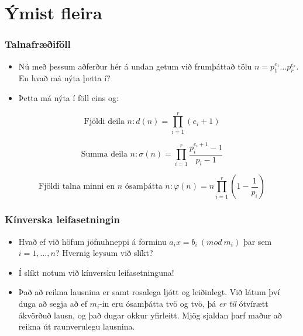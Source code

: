 \documentclass{beamer}
\newcommand\p[1]{\left(#1\right)}
\begin{document}
\section[Ýmist fleira]{Ýmist fleira}

\begin{frame}
\frametitle{Talnafræðiföll}

\begin{itemize}

\item<1-> Nú með þessum aðferður hér á undan getum við frumþáttað tölu $n = p_1^{e_1}\dots p_r^{e_r}$. En hvað má nýta þetta í?

\item<2-> Þetta má nýta í föll eins og:

\end{itemize}

 {\[\textrm{Fjöldi deila } n: d(n) = \prod_{i = 1}^r (e_i + 1)\]}

 {\[\textrm{Summa deila } n: \sigma(n) = \prod_{i = 1}^r \frac{p_i^{e_i + 1} - 1}{p_i - 1}\]}

 {\[\textrm{Fjöldi talna minni en } n \textrm{ ósamþátta } n: \varphi(n) = n\prod_{i = 1}^r \p{1 - \frac{1}{p_i}}\]}

\end{frame}

\begin{frame}
\frametitle{Kínverska leifasetningin}

\begin{itemize}

\item<1-> Hvað ef við höfum jöfnuhneppi á forminu $a_ix = b_i \ (mod \ m_i)$ þar sem $i = 1,\dots,n$? Hvernig leysum við slíkt?

\item<2-> Í slíkt notum við kínversku leifasetninguna!

\item<3-> Það að reikna lausnina er samt rosalega ljótt og leiðinlegt. Við látum því duga að segja að ef $m_i$-in eru ósamþátta tvö og tvö, þá \textit{er til} ótvírætt ákvörðuð lausn, og það dugar okkur yfirleitt. Mjög sjaldan þarf maður að reikna út raunverulegu lausnina.

\end{itemize}

\end{frame}
\end{document}
